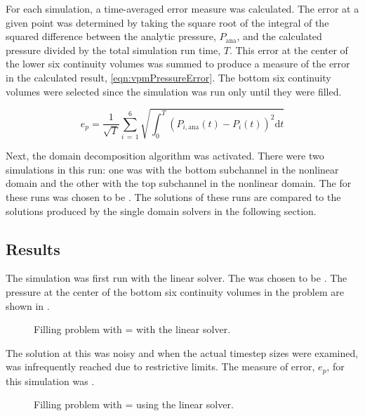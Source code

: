 For each simulation, a time-averaged error measure was calculated.
The error at a given point was determined by taking the square root of the integral of the squared difference between the analytic pressure, $P_{\text{ana}}$, and the calculated pressure divided by the total simulation run time, $T$.
This error at the center of the lower six continuity volumes was summed to produce a measure of the error in the calculated result, \eqref{eqn:vpmPressureError}.
The bottom six continuity volumes were selected since the simulation was run only until they were filled.

\begin{equation}
\label{eqn:vpmPressureError}
e_{p} =  \frac{1}{\sqrt{T}} \sum_{i\,=\,1}^{6}\sqrt{\int_{0}^{T} \left(P_{i,\text{ana}}(t) - P_{i}(t)\right)^{2} \mathrm{d} t}
\end{equation}

Next, the domain decomposition algorithm was activated.
There were two simulations in this run: one was with the bottom subchannel in the nonlinear domain and the other with the top subchannel in the nonlinear domain.
The \dtmax{} for these runs was chosen to be .
The solutions of these runs are compared to the solutions produced by the single domain solvers in the following section.

\subsection{Results}
\label{subsect:vmpResults}

The simulation was first run with the linear solver.
The \dtmax{} was chosen to be .
The pressure at the center of the bottom six continuity volumes in the problem are shown in .

\begin{figure}[h!tb]
\centering

\caption{Filling problem with \dtmax{} =  with the linear solver.}
\label{fig:linFill1em1}
\end{figure}

The solution at this \dtmax{} was noisy and when the actual timestep sizes were examined, \dtmax{} was infrequently reached due to restrictive \dtcrnt{} limits.
The measure of error, $e_{p}$, for this simulation was .

\begin{figure}[h!tb]
\centering

\caption{Filling problem with \dtmax{} =  using the linear solver.}
\label{fig:vmpLinFill5em2}
\end{figure}


